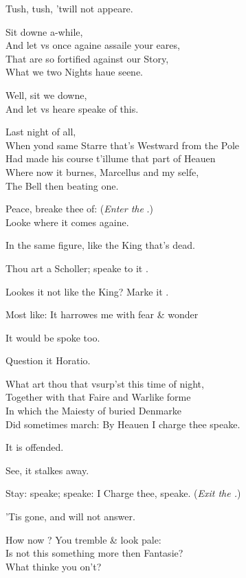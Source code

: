 \documentclass[a5paper,DIV=calc,11pt]{scrbook}
\begin{document}
\begin{drama*}
    \horspeaks Tush, tush, 'twill not appeare.

    \barnspeaks Sit downe a-while,\\
    And let vs once againe assaile your eares,\\
    That are so fortified against our Story,\\
    What we two Nights haue seene.

    \horspeaks Well, sit we downe,\\
    And let vs heare \barn speake of this.

    \barnspeaks Last night of all,\\
    When yond same Starre that's Westward from the Pole\\
    Had made his course t'illume that part of Heauen\\
    Where now it burnes, Marcellus and my selfe,\\
    The Bell then beating one.

    \marspeaks Peace, breake thee of: \hfill(\textit{Enter the \gho}.)\\
    Looke where it comes againe.

    \barnspeaks In the same figure, like the King that's dead.

    \marspeaks Thou art a Scholler; speake to it \hor.

    \barnspeaks Lookes it not like the King? Marke it \hor.

    \horspeaks Most like: It harrowes me with fear \& wonder

    \barnspeaks It would be spoke too.

    \marspeaks Question it Horatio.

    \horspeaks What art thou that vsurp'st this time of night,\\
    Together with that Faire and Warlike forme\\
    In which the Maiesty of buried Denmarke\\
    Did sometimes march: By Heauen I charge thee speake.

    \marspeaks It is offended.

    \barnspeaks See, it stalkes away.

    \horspeaks Stay: speake; speake: I Charge thee, speake. \hfill(\textit{Exit the \gho.})

    \marspeaks 'Tis gone, and will not answer.

    \marspeaks How now \hor? You tremble \& look pale:\\
    Is not this something more then Fantasie?\\
    What thinke you on't?


\end{drama*}
\end{document}
